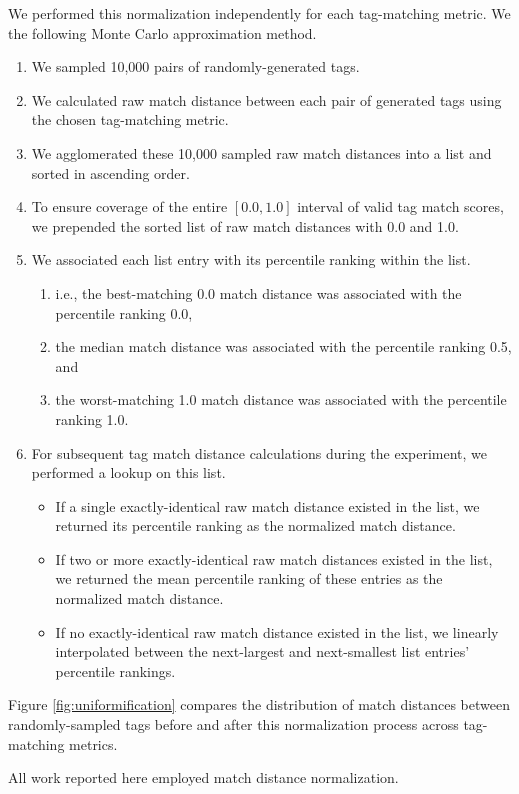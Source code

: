 We performed this normalization independently for each tag-matching metric.
We the following Monte Carlo approximation method.
\begin{enumerate}
\item We sampled 10,000 pairs of randomly-generated tags.
\item We calculated raw match distance between each pair of generated tags using the chosen tag-matching metric.
\item We agglomerated these 10,000 sampled raw match distances into a list and sorted in ascending order.
\item To ensure coverage of the entire $[0.0,1.0]$ interval of valid tag match scores, we prepended the sorted list of raw match distances with 0.0 and 1.0.
\item We associated each list entry with its percentile ranking within the list.
\begin{enumerate}
    \item i.e., the best-matching 0.0 match distance was associated with the percentile ranking 0.0,
    \item the median match distance was associated with the percentile ranking 0.5, and
    \item the worst-matching 1.0 match distance was associated with the percentile ranking 1.0.
\end{enumerate}
\item For subsequent tag match distance calculations during the experiment, we performed a lookup on this list.
\begin{itemize}
    \item If a single exactly-identical raw match distance existed in the list, we returned its percentile ranking as the normalized match distance.
    \item If two or more exactly-identical raw match distances existed in the list, we returned the mean percentile ranking of these entries as the normalized match distance.
    \item If no exactly-identical raw match distance existed in the list, we linearly interpolated between the next-largest and next-smallest list entries' percentile rankings. 
\end{itemize}
\end{enumerate}
Figure \ref{fig:uniformification} compares the distribution of match distances between randomly-sampled tags before and after this normalization process across tag-matching metrics.

All work reported here employed match distance normalization.